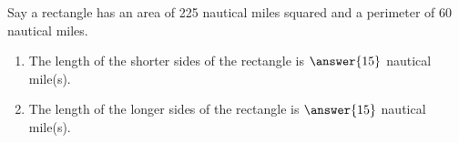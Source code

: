 \documentclass{ximera}
\author{Kenneth Berglund}
\begin{document}
\begin{exercise}
Say a rectangle has an area of 225 nautical miles squared and a perimeter of 60 nautical miles.  

\begin{enumerate}
\item The length of the shorter sides of the rectangle is $\answer{15}$ nautical mile(s).
\item The length of the longer sides of the rectangle is $\answer{15}$ nautical mile(s).
\end{enumerate}

\end{exercise}
\end{document}
